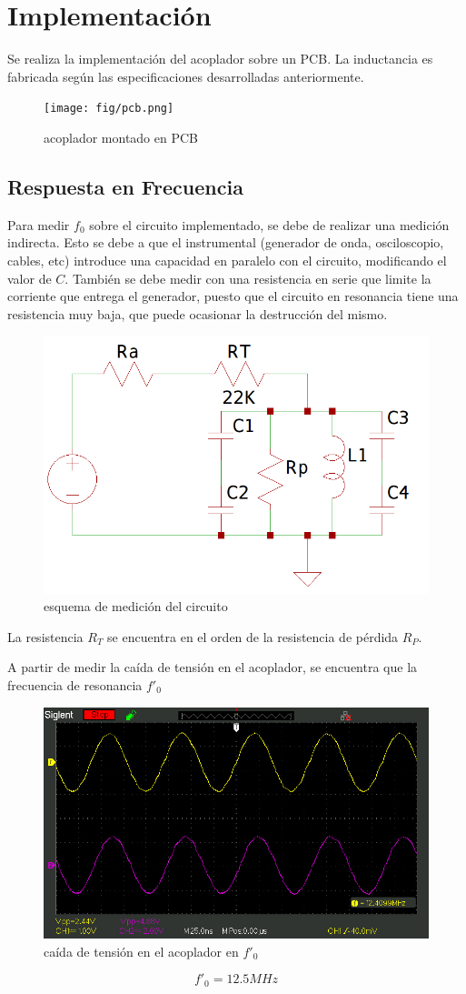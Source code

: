 \section{Implementación}
Se realiza la implementación del acoplador sobre un PCB. La inductancia es fabricada según las especificaciones desarrolladas anteriormente.

\begin{figure}[H]
    \centering
    \texttt{[image: fig/pcb.png]}
    \caption{acoplador montado en PCB}
    \label{fig:enter-label}
\end{figure}

\subsection{Respuesta en Frecuencia}
Para medir $f_0$ sobre el circuito implementado, se debe de realizar una medición indirecta. Esto se debe a que el instrumental (generador de onda, osciloscopio, cables, etc) introduce una capacidad en paralelo con el circuito, modificando el valor de $C$. También se debe medir con una resistencia en serie que limite la corriente que entrega el generador, puesto que el circuito en resonancia tiene una resistencia muy baja, que puede ocasionar la destrucción del mismo.

\begin{figure}[H]
    \centering
    \includegraphics[width=0.5\linewidth]{fig/esqm.png}
    \caption{esquema de medición del circuito}
    \label{fig:enter-label}
\end{figure}

La resistencia $R_T$ se encuentra en el orden de la resistencia de pérdida $R_P$.

A partir de medir la caída de tensión en el acoplador, se encuentra que la frecuencia de resonancia $f'_0$ 

\begin{figure}[H]
    \centering
    \includegraphics[width=0.5\linewidth]{oscilo/SDS00003.jpg}
    \caption{caída de tensión en el acoplador en $f'_0$}
    \label{fig:enter-label}
\end{figure}
$$
f'_0 = 12.5MHz
$$

